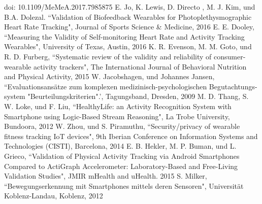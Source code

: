 \documentclass[conference]{IEEEtran}
\begin{document}
\begin{thebibliography}{00}
doi: 10.1109/MeMeA.2017.7985875
 E. Jo, K. Lewis, D. Directo , M. J.  Kim, und B.A. Dolezal. ``Validation of Biofeedback Wearables for Photoplethysmographic Heart Rate Tracking", Journal of Sports Science \& Medicine, 2016
 E. E. Dooley, ``Measuring the Validity of Self-monitoring Heart Rate and Activity Tracking Wearables", University of Texas, Austin, 2016
 K. R. Evenson, M. M. Goto, und R. D. Furberg, ``Systematic review of the validity and reliability of consumer-wearable activity trackers", The International Journal of Behavioral Nutrition and Physical Activity, 2015
 W. Jacobshagen, und Johannes Jansen, ``Evaluationsansätze zum komplexen medizinisch-psychologischen Begutachtungs-system "Beurteilungskriterien".', Tagungsband,  Dresden, 2009
 M. D. Thang, S. W. Loke, und F. Liu, ``HealthyLife: an Activity Recognition System with Smartphone using Logic-Based Stream Reasoning",  La Trobe University, Bundoora, 2012
 W. Zhou, und S. Piramuthu, ``Security/privacy of wearable fitness tracking IoT devices", 9th Iberian Conference on Information Systems and Technologies (CISTI), Barcelona, 2014
 E. B. Hekler, M. P. Buman, und L. Grieco, ``Validation of Physical Activity Tracking via Android Smartphones Compared to ActiGraph Accelerometer: Laboratory-Based and Free-Living Validation Studies", JMIR mHealth and uHealth. 2015
 S. Milker, ``Bewegungserkennung mit Smartphones mittels deren Sensoren", Universität Koblenz-Landau, Koblenz, 2012
\end{thebibliography}
\end{document}
